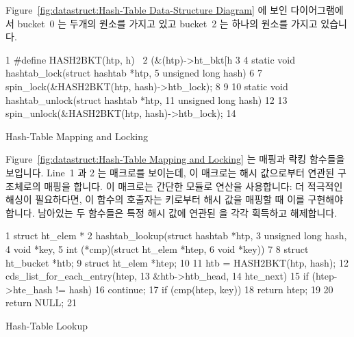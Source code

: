 Figure~\ref{fig:datastruct:Hash-Table Data-Structure Diagram}
에 보인 다이어그램에서 bucket~0 는 두개의 원소를 가지고 있고 bucket~2 는 하나의
원소를 가지고 있습니다.

\begin{listing}[tb]
{ \scriptsize
\begin{verbbox}
 1 #define HASH2BKT(htp, h) \
 2   (&(htp)->ht_bkt[h %
 3 
 4 static void hashtab_lock(struct hashtab *htp,
 5                          unsigned long hash)
 6 {
 7   spin_lock(&HASH2BKT(htp, hash)->htb_lock);
 8 }
 9 
10 static void hashtab_unlock(struct hashtab *htp,
11                            unsigned long hash)
12 {
13   spin_unlock(&HASH2BKT(htp, hash)->htb_lock);
14 }
\end{verbbox}
}
\centering
\theverbbox
\caption{Hash-Table Mapping and Locking}
\label{lst:datastruct:Hash-Table Mapping and Locking}
\end{listing}

Figure~\ref{fig:datastruct:Hash-Table Mapping and Locking}
는 매핑과 락킹 함수들을 보입니다.
Line~1 과 2 는  매크로를 보이는데, 이 매크로는 해시 값으로부터
연관된  구조체로의 매핑을 합니다.
이 매크로는 간단한 모듈로 연산을 사용합니다: 더 적극적인 해싱이 필요하다면, 이
함수의 호출자는 키로부터 해시 값을 매핑할 때 이를 구현해야 합니다.
남아있는 두 함수들은 특정 해시 값에 연관된  을 각각 획득하고
해제합니다.

\begin{listing}[tb]
{ \scriptsize
\begin{verbbox}
 1 struct ht_elem *
 2 hashtab_lookup(struct hashtab *htp,
 3                unsigned long hash,
 4                void *key,
 5                int (*cmp)(struct ht_elem *htep,
 6                           void *key))
 7 {
 8   struct ht_bucket *htb;
 9   struct ht_elem *htep;
10 
11   htb = HASH2BKT(htp, hash);
12   cds_list_for_each_entry(htep,
13                           &htb->htb_head,
14                           hte_next) {
15     if (htep->hte_hash != hash)
16       continue;
17     if (cmp(htep, key))
18       return htep;
19   }
20   return NULL;
21 }
\end{verbbox}
}
\centering
\theverbbox
\caption{Hash-Table Lookup}
\label{lst:datastruct:Hash-Table Lookup}
\end{listing}

